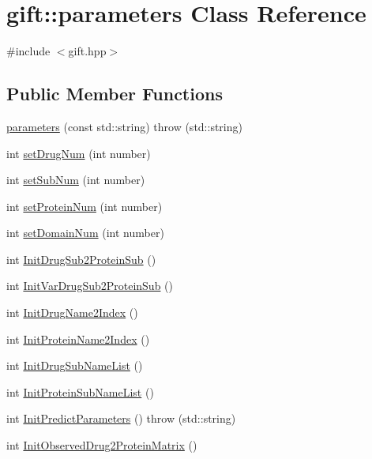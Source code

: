 \hypertarget{classgift_1_1parameters}{}\section{gift\+:\+:parameters Class Reference}
\label{classgift_1_1parameters}


{\ttfamily \#include $<$gift.\+hpp$>$}

\subsection*{Public Member Functions}
\begin{DoxyCompactItemize}
\item 
\hyperlink{classgift_1_1parameters_a9edcead2b7c28e67f4e16d3bdd367b08}{parameters} (const std\+::string)  throw (std\+::string)
\item 
int \hyperlink{classgift_1_1parameters_aa156d327fa5a39dcb244fff78f4ff65c}{set\+Drug\+Num} (int number)
\item 
int \hyperlink{classgift_1_1parameters_a288073192db0ccee557d8ff29689e05e}{set\+Sub\+Num} (int number)
\item 
int \hyperlink{classgift_1_1parameters_aea2bf8dc40a1773e274acb6d4fdfa18b}{set\+Protein\+Num} (int number)
\item 
int \hyperlink{classgift_1_1parameters_afb3b8abfd2b702a73ce7edb1d224f429}{set\+Domain\+Num} (int number)
\item 
int \hyperlink{classgift_1_1parameters_abba99b2d15b09c76770e91a8d6da28cc}{Init\+Drug\+Sub2\+Protein\+Sub} ()
\item 
int \hyperlink{classgift_1_1parameters_ad87b69e82d76576a87bb2d202b5effa7}{Init\+Var\+Drug\+Sub2\+Protein\+Sub} ()
\item 
int \hyperlink{classgift_1_1parameters_a7cd6167e6f16d0fea1a34884dc190571}{Init\+Drug\+Name2\+Index} ()
\item 
int \hyperlink{classgift_1_1parameters_a5508049f8c624d7f1e5f6e28b2f1317f}{Init\+Protein\+Name2\+Index} ()
\item 
int \hyperlink{classgift_1_1parameters_a1b08a4fd08e6db0672e8a67f789dbd02}{Init\+Drug\+Sub\+Name\+List} ()
\item 
int \hyperlink{classgift_1_1parameters_a5b97e2bae71221853eb0afe0141c760a}{Init\+Protein\+Sub\+Name\+List} ()
\item 
int \hyperlink{classgift_1_1parameters_a42a85f0f8c106599741885f51d22dfd8}{Init\+Predict\+Parameters} ()  throw (std\+::string)
\item 
int \hyperlink{classgift_1_1parameters_a4feb530f351f217aa6228801e9ff1fc9}{Init\+Observed\+Drug2\+Protein\+Matrix} ()
\end{DoxyCompactItemize}
